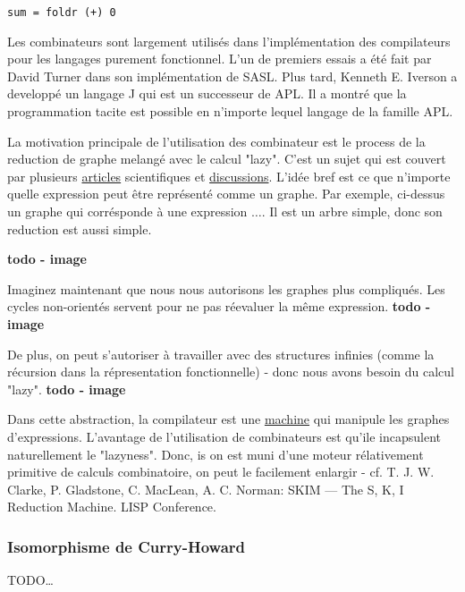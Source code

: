 \verb|sum = foldr (+) 0|

Les combinateurs sont largement utilisés dans l'implémentation des compilateurs pour les langages purement fonctionnel. L'un de premiers essais a été fait par David Turner dans son implémentation de SASL. Plus tard, Kenneth E. Iverson a developpé un langage J qui est un successeur de APL. Il a montré que la programmation tacite est possible en n'importe lequel langage de la famille APL.

La motivation principale de l'utilisation des combinateur est le process de la reduction de graphe melangé avec le calcul "lazy". C'est un sujet qui est couvert par plusieurs \href{http://citeseerx.ist.psu.edu/viewdoc/download?doi=10.1.1.519.2508&rep=rep1&type=pdf}{articles} scientifiques et \href{https://www.reddit.com/r/haskell/comments/q0ngj/lazy_evaluation_vs_leftmost_reduction_with_graph/}{discussions}. L'idée bref est ce que n'importe quelle expression peut être représenté comme un graphe. Par exemple, ci-dessus un graphe qui corrésponde à une expression $\ldots$. Il est un arbre simple, donc son reduction est aussi simple.

\textbf{todo - image}

Imaginez maintenant que nous nous autorisons les graphes plus compliqués. Les cycles non-orientés servent pour ne pas réevaluer la même expression. \textbf{todo - image}

De plus, on peut s'autoriser à travailler avec des structures infinies (comme la récursion dans la répresentation fonctionnelle) - donc nous avons besoin du calcul "lazy".
\textbf{todo - image}

Dans cette abstraction, la compilateur est une \href{https://en.wikipedia.org/wiki/Graph_reduction_machine}{machine} qui manipule les graphes d'expressions. L'avantage de l'utilisation de combinateurs est qu'ile incapsulent naturellement le "lazyness". Donc, is on est muni d'une moteur rélativement primitive de calculs combinatoire, on peut le facilement enlargir - cf. T. J. W. Clarke, P. Gladstone, C. MacLean, A. C. Norman: SKIM — The S, K, I Reduction Machine. LISP Conference.

\subsubsection*{Isomorphisme de Curry-Howard}

TODO\ldots